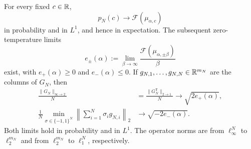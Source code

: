\begin{corollary}\label{gen:wishart}
For every fixed $c\in\mathbb R$,
\begin{equation}\label{gen:wishart-limit}
 p_N(c)\longrightarrow\mathcal F(\mu_{\alpha,c})
\end{equation}
in probability and in $L^1$, and hence in expectation. The subsequent
zero-temperature limits
\begin{equation}\label{gen:wishart-zero-temperature}
 e_\pm(\alpha):=
 \lim_{\beta\to\infty}\frac{\mathcal F(\mu_{\alpha,\pm\beta})}{\beta}
\end{equation}
exist, with $e_+(\alpha)\ge0$ and $e_-(\alpha)\le0$. If
$g_{N,1},\ldots,g_{N,N}\in\mathbb R^{m_N}$ are the columns of $G_N$, then
\begin{align}
 \frac{\|G_N\|_{\infty\to2}}N
 &=\frac{\|G_N^{\mathsf T}\|_{2\to1}}N
 \longrightarrow\sqrt{2e_+(\alpha)}, \label{gen:gaussian-max-norm}\\
 \frac1N\min_{\sigma\in\{-1,1\}^N}
 \left\|\sum_{i=1}^N\sigma_i g_{N,i}\right\|_2
 &\longrightarrow\sqrt{-2e_-(\alpha)}. \label{gen:gaussian-min-sum}
\end{align}
Both limits hold in probability and in $L^1$. The operator norms are
from $\ell_\infty^N$ to $\ell_2^{m_N}$ and from $\ell_2^{m_N}$ to
$\ell_1^N$, respectively.
\end{corollary}

